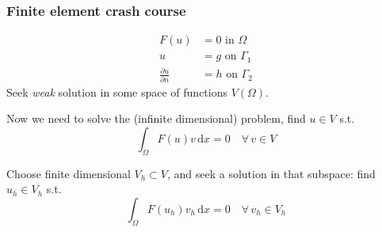 \documentclass[presentation]{beamer}
\begin{document}
\begin{frame}
  \frametitle{Finite element crash course}
  \begin{align*}
    F(u) &= 0 \text{ in $\Omega$}\\
    u &= g \text{ on $\Gamma_1$}\\
    \frac{\partial u}{\partial n} &= h \text{ on $\Gamma_2$}
  \end{align*}
  Seek \emph{weak} solution in some space of functions $V(\Omega)$.

  Now we need to solve the (infinite dimensional) problem, find $u\in V$ s.t.
  \begin{equation*}
    \int_\Omega \!F(u) v\, \text{d}x = 0 \quad \forall\, v \in V
  \end{equation*}
\end{frame}
\begin{frame}
  Choose finite dimensional $V_h \subset V$, and seek a solution in
  that subspace: find $u_h \in V_h$ s.t.
  \begin{equation*}
    \int_\Omega \!F(u_h) v_h\, \text{d}x = 0 \quad \forall\, v_h \in V_h
  \end{equation*}
\end{frame}
\end{document}
